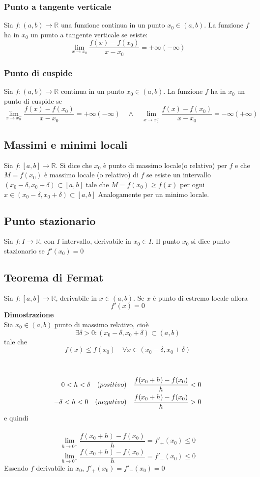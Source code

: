 \documentclass[12pt]{article}
\begin{document}
\subsubsection{Punto a tangente verticale}
Sia $f: (a,b) \to \mathbb{R}$ una funzione continua in un punto $x_0 \in (a,b)$. La funzione $f$ ha in $x_0$ un punto a tangente verticale se esiste:
\[ \lim_{x \to x_0} \frac{f(x) - f(x_0)}{x - x_0} = +\infty(-\infty) \]

\subsubsection{Punto di cuspide}
Sia $f: (a,b) \to \mathbb{R}$ continua in un punto $x_0 \in (a,b)$. La funzione $f$ ha in $x_0$
un punto di cuspide se
\[ \lim_{x \to x_{0}^{-}} \frac{f(x) - f(x_0)}{x - x_0} = +\infty(-\infty)
\quad \wedge \quad
\lim_{x \to x_{0}^{+}} \frac{f(x) - f(x_0)}{x - x_0} = -\infty(+\infty)\]

\subsection{Massimi e minimi locali}
Sia $f: [a,b] \to \mathbb{R}$. Si dice che $x_0$
è punto di massimo locale(o relativo) per $f$ e che
$M = f(x_0)$ è massimo locale (o relativo) di $f$ se
esiste un intervallo $(x_0 - \delta, x_0 + \delta) \subset [a,b]$
tale che $M = f(x_0) \geq f(x)$
per ogni $x \in (x_0 - \delta, x_0 + \delta) \subset [a,b]$
Analogamente per un minimo locale.

\subsection{Punto stazionario}
Sia $f: I \to \mathbb{R}$, con $I$ intervallo, derivabile in $x_0 \in I$.
Il punto $x_0$ si dice punto stazionario se $f'(x_0) = 0$

\subsection{Teorema di Fermat}
Sia $f: [a,b] \to \mathbb{R}$, derivabile in $x \in (a,b)$.
Se $x$ è punto di estremo locale allora
\[f'(x) = 0\]
\textbf{Dimostrazione}\\
Sia $x_0 \in (a,b)$ punto di massimo relativo, cioè
\[ \exists \delta > 0: (x_0 - \delta, x_0 + \delta) \subset (a,b)\]
tale che
\[f(x) \leq f(x_0)\quad \forall x \in (x_0 - \delta, x_0 + \delta)\] \\ \\
\[ \begin{aligned}  \quad 0 < h < \delta \text \quad {(positivo)} \quad \frac{f(x_0 +h) - f(x_0)}{h}<0 \\ 
 -\delta <h<0 \text \quad {(negativo)} \quad \frac{f(x_0 +h) - f(x_0)}{h}>0 \end{aligned} \] 
e quindi\\ \\
\[ \lim_{h \to 0^+} \frac{f(x_0 +h) - f(x_0)}{h} = f'_{+}(x_0) \leq 0 \]
\[ \lim_{h \to 0^-} \frac{f(x_0 +h) - f(x_0)}{h} = f'_{-}(x_0) \leq 0 \]
Essendo $f$ derivabile in $x_0$, $f'_{+}(x_0) = f'_{-}(x_0) = 0$
\end{document}
